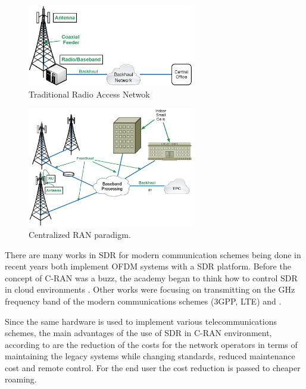 \begin{figure}[htbp]
    \centering
    \includegraphics[width=0.65\textwidth]{./figures/traditional_bs}
    \caption{ Traditional Radio Access Netwok
    \label{fig:tran}}
\end{figure}

\begin{figure}[htbp]
    \centering
    \includegraphics[width=0.65\textwidth]{./figures/c_RAN}
    \caption{ Centralized RAN paradigm.
    \label{fig:cran}}
\end{figure}

There are many works in SDR for modern communication schemes being done in
recent years \cite{neenu2014} \cite{kelley2009} both implement OFDM systems with
a SDR platform. Before the concept of C-RAN was a buzz, the academy began to
think how to control SDR in cloud environments \cite{dayananda2012}. Other works
were focusing on transmitting on the GHz frequency band of the modern
communications schemes (3GPP, LTE) \cite{kelley2009} and \cite{neenu2014}.

Since the same hardware is used to implement various telecommunications schemes,
the main advantages of the use of SDR in C-RAN environment, according to
\cite{dayananda2012} are the reduction of the costs for the network operators in
terms of maintaining the legacy systems while changing standards, reduced
maintenance cost and remote control. For the end user the cost reduction is
passed to cheaper roaming.

